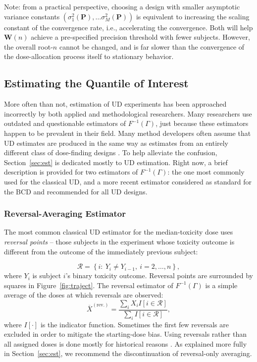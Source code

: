 Note: from a practical perspective, choosing a design with smaller asymptotic variance constants $\left(\sigma_1^2(\mathbf{P}),\ldots\sigma_M^2(\mathbf{P})\right)$ is equivalent to increasing the scaling constant of the convergence rate, i.e., accelerating the convergence. Both will help $\mathbf{W}(n)$ achieve a pre-specified precision threshold with fewer subjects. However, the overall root-$n$ cannot be changed, and is far slower than the convergence of the dose-allocation process itself to stationary behavior.

\subsection{Estimating the Quantile of Interest}

More often than not, estimation of UD experiments has been approached incorrectly by both applied and methodological researchers. Many researchers use outdated and questionable estimators of $F^{-1}(\Gamma)$, just because these estimators happen to be prevalent in their field. Many method developers often assume that UD estimates are produced in the same way as estimates from an entirely different class of dose-finding designs \citep{Zack:stag:2009}. To help alleviate the confusion, Section~\ref{sec:est} is dedicated mostly to UD estimation. Right now, a brief description is provided for two  estimators of $F^{-1}(\Gamma)$: the one most commonly used for the classical UD, and a more recent estimator considered as standard for the BCD and recommended for all UD designs.

\subsubsection{Reversal-Averaging Estimator}

The most common classical UD estimator for the median-toxicity dose uses \emph{reversal points} -- those subjects in the experiment whose toxicity outcome is different from the outcome of the immediately previous subject:

\begin{equation}\label{eq:reversal}
\mathcal{R}=\left\{i:\ Y_i\neq Y_{i-1},\ i=2,\ldots ,n\right\},
\end{equation}
where $Y_i$ is subject $i$'s binary toxicity outcome. Reversal points are surrounded by squares in Figure~\ref{fig:traject}. The reversal estimator of $F^{-1}(\Gamma)$ is a simple average of the doses at which reversals are observed:
\begin{equation}\label{eq:reversav}
\overline{X}^{\mathrm{(rev.)}}=\frac{\sum_iX_iI\left[i\in\mathcal{R}\right]}{\sum_iI\left[i\in\mathcal{R}\right]},
\end{equation}
\noindent where $I[\cdot]$ is the indicator function. Sometimes the first few reversals are excluded in order to mitigate the starting-dose bias. Using reversals rather than all assigned doses is done mostly for historical reasons \citep{Weth:Chen:Vasu:est:1966}. As explained more fully in Section~\ref{sec:est}, we recommend the discontinuation of reversal-only averaging.

